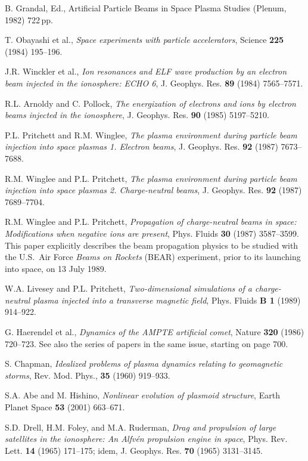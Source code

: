 \documentclass [12pt,a4paper,     ]{report} %
\begin{document}
\begin{enumerate}
 B. Grandal, Ed., Artificial Particle Beams in Space Plasma Studies (Plenum, 1982) 722\,pp.

 T. Obayashi et al., \emph{Space experiments with particle accelerators}, Science {\bf 225} (1984) 195--196.

 J.R. Winckler et al., \emph{Ion resonances and ELF wave production by an electron beam injected in the ionosphere: ECHO 6}, J. Geophys. Res. {\bf 89} (1984) 7565--7571.

 R.L. Arnoldy and C. Pollock, \emph{The energization of electrons and ions by electron beams injected in the ionosphere}, J. Geophys. Res. {\bf 90} (1985) 5197--5210.

 P.L. Pritchett and R.M. Winglee, \emph{The plasma environment during particle beam injection into space plasmas 1. Electron beams}, J. Geophys. Res. {\bf 92} (1987) 7673--7688.

 R.M. Winglee and P.L. Pritchett, \emph{The plasma environment during particle beam injection into space plasmas 2. Charge-neutral beams}, J. Geophys. Res. {\bf 92} (1987) 7689--7704.

 R.M. Winglee and P.L. Pritchett, \emph{Propagation of charge-neutral beams in space: Modifications when negative ions are present}, Phys. Fluids {\bf 30} (1987) 3587--3599. This paper explicitly describes the beam propagation physics to be studied with the U.S.\ Air Force \emph{Beams on Rockets} (BEAR) experiment, prior to its launching into space, on 13 July 1989.

 W.A. Livesey and P.L. Pritchett, \emph{Two-dimensional simulations of a charge-neutral plasma injected into a transverse magnetic field},  Phys. Fluids {\bf B 1} (1989) 914--922.

 G. Haerendel et al., \emph{Dynamics of the AMPTE artificial comet}, Nature {\bf 320} (1986) 720--723.  See also the series of papers in the same issue, starting on page 700.

 S. Chapman, \emph{Idealized problems of plasma dynamics relating to geomagnetic storms}, Rev. Mod. Phys., {\bf 35} (1960) 919--933.

 S.A. Abe and M. Hishino, \emph{Nonlinear evolution of plasmoid structure}, Earth Planet Space {\bf 53} (2001) 663--671.

 S.D. Drell, H.M. Foley, and M.A. Ruderman, \emph{Drag and propulsion of large satellites in the ionosphere: An Alfv\'en propulsion engine in space}, Phys. Rev. Lett. {\bf 14} (1965) 171--175; idem, J. Geophys. Res. {\bf 70} (1965) 3131--3145.


\end{enumerate}
\end{document}

